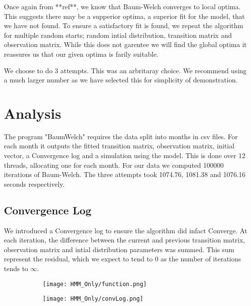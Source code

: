 Once again from **ref**, we know that Baum-Welch converges to local optima. This suggests there may be a supperior optima, a superior fit for the model, that we have not found. To ensure a satisfactory fit is found, we repeat the algorithm for multiple random starts; random intial distribution, transition matrix and observation matrix. While this does not garentee we will find the global optima it reassures us that our given optima is farily suitable. 


We choose to do 3 attempts. This was an arbritaray choice. We recommend using a much larger number as we have selected this for simplicity of demonstration.


\section{Analysis}

The program "BaumWelch" requires the data split into months in csv files. For each month it outputs the fitted transition matrix, observation matrix, initial vector, a Convergence log and a simulation using the model. This is done over 12 threads, allocating one for each month. For our data we computed 100000 iterations of Baum-Welch. The three attempts took 1074.76, 1081.38 and 1076.16 seconds respectively.

\subsection{Convergence Log}

We introduced a Convergence log to ensure the algorithm did infact Converge. At each iteration, the difference between the current and previous transition matrix, observation matrix and intial distribution parameters was summed. This sum represent the residual, which we expect to tend to 0 as the number of iterations tends to $\infty$.

\begin{figure}
    \begin{subfigure}{.45\textwidth}
      \centering
      \texttt{[image: HMM\_Only/function.png]}
      \caption{}
      \label{func}
    \end{subfigure}
    \begin{subfigure}{.45\textwidth}
      \centering
      \texttt{[image: HMM\_Only/convLog.png]}
      \caption{}
      \label{convlog}
    \end{subfigure}
    \caption{}
\end{figure}

